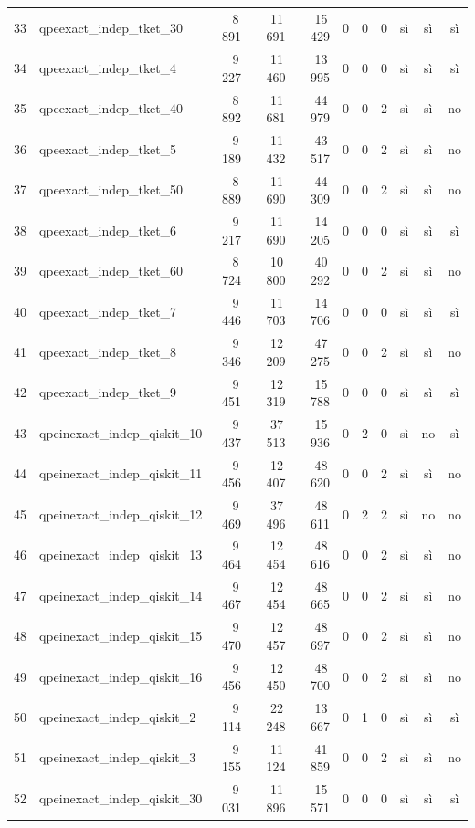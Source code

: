 \documentclass[a4paper,10pt]{article}
\begin{document}
\begin{landscape}
\begin{longtable}{r l rrr rrr ccc}
33 & qpeexact\_indep\_tket\_30 & 8\,891 & 11\,691 & 15\,429 & 0 & 0 & 0 & sì & sì & sì\\
34 & qpeexact\_indep\_tket\_4 & 9\,227 & 11\,460 & 13\,995 & 0 & 0 & 0 & sì & sì & sì\\
35 & qpeexact\_indep\_tket\_40 & 8\,892 & 11\,681 & 44\,979 & 0 & 0 & 2 & sì & sì & no\\
36 & qpeexact\_indep\_tket\_5 & 9\,189 & 11\,432 & 43\,517 & 0 & 0 & 2 & sì & sì & no\\
37 & qpeexact\_indep\_tket\_50 & 8\,889 & 11\,690 & 44\,309 & 0 & 0 & 2 & sì & sì & no\\
38 & qpeexact\_indep\_tket\_6 & 9\,217 & 11\,690 & 14\,205 & 0 & 0 & 0 & sì & sì & sì\\
39 & qpeexact\_indep\_tket\_60 & 8\,724 & 10\,800 & 40\,292 & 0 & 0 & 2 & sì & sì & no\\
40 & qpeexact\_indep\_tket\_7 & 9\,446 & 11\,703 & 14\,706 & 0 & 0 & 0 & sì & sì & sì\\
41 & qpeexact\_indep\_tket\_8 & 9\,346 & 12\,209 & 47\,275 & 0 & 0 & 2 & sì & sì & no\\
42 & qpeexact\_indep\_tket\_9 & 9\,451 & 12\,319 & 15\,788 & 0 & 0 & 0 & sì & sì & sì\\
43 & qpeinexact\_indep\_qiskit\_10 & 9\,437 & 37\,513 & 15\,936 & 0 & 2 & 0 & sì & no & sì\\
44 & qpeinexact\_indep\_qiskit\_11 & 9\,456 & 12\,407 & 48\,620 & 0 & 0 & 2 & sì & sì & no\\
45 & qpeinexact\_indep\_qiskit\_12 & 9\,469 & 37\,496 & 48\,611 & 0 & 2 & 2 & sì & no & no\\
46 & qpeinexact\_indep\_qiskit\_13 & 9\,464 & 12\,454 & 48\,616 & 0 & 0 & 2 & sì & sì & no\\
47 & qpeinexact\_indep\_qiskit\_14 & 9\,467 & 12\,454 & 48\,665 & 0 & 0 & 2 & sì & sì & no\\
48 & qpeinexact\_indep\_qiskit\_15 & 9\,470 & 12\,457 & 48\,697 & 0 & 0 & 2 & sì & sì & no\\
49 & qpeinexact\_indep\_qiskit\_16 & 9\,456 & 12\,450 & 48\,700 & 0 & 0 & 2 & sì & sì & no\\
50 & qpeinexact\_indep\_qiskit\_2 & 9\,114 & 22\,248 & 13\,667 & 0 & 1 & 0 & sì & sì & sì\\
51 & qpeinexact\_indep\_qiskit\_3 & 9\,155 & 11\,124 & 41\,859 & 0 & 0 & 2 & sì & sì & no\\
52 & qpeinexact\_indep\_qiskit\_30 & 9\,031 & 11\,896 & 15\,571 & 0 & 0 & 0 & sì & sì & sì\\

\end{longtable}
\end{landscape}
\end{document}
